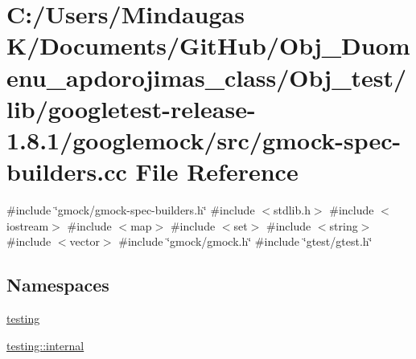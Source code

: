 \hypertarget{_obj__test_2lib_2googletest-release-1_88_81_2googlemock_2src_2gmock-spec-builders_8cc}{}\section{C\+:/\+Users/\+Mindaugas K/\+Documents/\+Git\+Hub/\+Obj\+\_\+\+Duomenu\+\_\+apdorojimas\+\_\+class/\+Obj\+\_\+test/lib/googletest-\/release-\/1.8.1/googlemock/src/gmock-\/spec-\/builders.cc File Reference}
\label{_obj__test_2lib_2googletest-release-1_88_81_2googlemock_2src_2gmock-spec-builders_8cc}
{\ttfamily \#include \char`\"{}gmock/gmock-\/spec-\/builders.\+h\char`\"{}}\newline
{\ttfamily \#include $<$stdlib.\+h$>$}\newline
{\ttfamily \#include $<$iostream$>$}\newline
{\ttfamily \#include $<$map$>$}\newline
{\ttfamily \#include $<$set$>$}\newline
{\ttfamily \#include $<$string$>$}\newline
{\ttfamily \#include $<$vector$>$}\newline
{\ttfamily \#include \char`\"{}gmock/gmock.\+h\char`\"{}}\newline
{\ttfamily \#include \char`\"{}gtest/gtest.\+h\char`\"{}}\newline
\subsection*{Namespaces}
\begin{DoxyCompactItemize}
\item 
 \mbox{\hyperlink{namespacetesting}{testing}}
\item 
 \mbox{\hyperlink{namespacetesting_1_1internal}{testing\+::internal}}
\end{DoxyCompactItemize}
